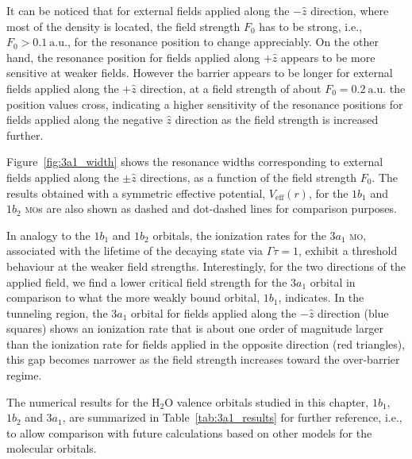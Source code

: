 It can be noticed that for external fields applied along the
$-\hat{z}$ direction, where most of the density is located, the field
strength $F_{0}$ has to be strong, i.e., $F_{0}>0.1\ \mathrm{a.u.}$,
for the resonance position to change appreciably. On the other hand,
the resonance position for fields applied along $+\hat{z}$ appears to
be more sensitive at weaker fields. However the barrier appears to be
longer for external fields applied along the $+\hat{z}$ direction, at
a field strength of about $F_{0} = 0.2\ \mathrm{a.u.}$ the position
values cross, indicating a higher sensitivity of the resonance
positions for fields applied along the negative $\hat{z}$ direction as
the field strength is increased further.

Figure~\ref{fig:3a1_width} shows the resonance widths corresponding to
external fields applied along the $\pm\hat{z}$ directions, as a
function of the field strength $F_{0}$. The results obtained with a
symmetric effective potential, $V_{\mathrm{eff}}(r)$, for the $1b_{1}$
and $1b_{2}$ \textsc{mo}s are also shown as dashed and dot-dashed
lines for comparison purposes.

In analogy to the $1b_{1}$ and $1b_{2}$ orbitals, the ionization rates
for the $3a_{1}$ \textsc{mo}, associated with the lifetime of the
decaying state via $\Gamma\tau=1$, exhibit a threshold behaviour at
the weaker field strengths. Interestingly, for the two directions of
the applied field, we find a lower critical field strength for the
$3a_{1}$ orbital in comparison to what the more weakly bound orbital,
$1b_{1}$, indicates.  In the tunneling region, the $3a_{1}$ orbital
for fields applied along the $-\hat{z}$ direction (blue squares) shows
an ionization rate that is about one order of magnitude larger than
the ionization rate for fields applied in the opposite direction (red
triangles), this gap becomes narrower as the field strength increases
toward the over-barrier regime.

The numerical results for the H$_{2}$O valence orbitals studied in
this chapter, $1b_{1}$, $1b_{2}$ and $3a_{1}$, are summarized in
Table~\ref{tab:3a1_results} for further reference, i.e., to allow
comparison with future calculations based on other models for the
molecular orbitals.


